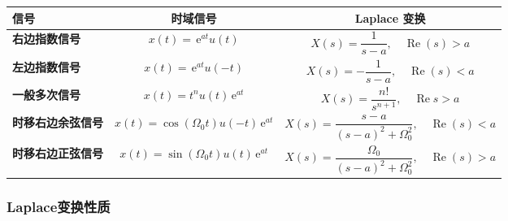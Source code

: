 \documentclass[UTF8,fontset=fandol,zihao=5]{ctexart}
\newcommand{\ee}{\,\mathrm{e}}
\newcommand{\RRe}{\operatorname{Re}}
\begin{document}
\begin{table}[H]
  \centering
  \begin{tabularx}{\textwidth}{>{\bfseries}p{3cm} c c}
    \toprule
    信号 & 时域信号 & Laplace 变换 \\
    \midrule
    右边指数信号 & $x(t)=\ee^{at}u(t)$
      & $X(s)=\dfrac{1}{s-a},\quad \operatorname{Re}(s)>a$ \\

    左边指数信号 & $x(t)=\ee^{at}u(-t)$
      & $X(s)=-\dfrac{1}{s-a},\quad \operatorname{Re}(s)<a$ \\
    
    一般多次信号  & $x(t)=t^n u(t) \ee^{at}$
      & $X(s)=\dfrac{n!}{s^{n+1}},\quad \RRe s > a$ \\

    时移右边余弦信号 & $x(t)=\cos(\varOmega_0t)u(-t)\ee^{at}$
      & $X(s)=\dfrac{s-a}{(s-a)^2+\varOmega_0^2},
        \quad \operatorname{Re}(s)<a$ \\

    时移右边正弦信号 & $x(t)=\sin(\varOmega_0t)u(t)\ee^{at}$
      & $X(s)=\dfrac{\varOmega_0}{(s-a)^2+\varOmega_0^2},
        \quad \operatorname{Re}(s)>a$ \\
    \bottomrule
  \end{tabularx}
\end{table}

\subsubsection{Laplace变换性质}
\end{document}
